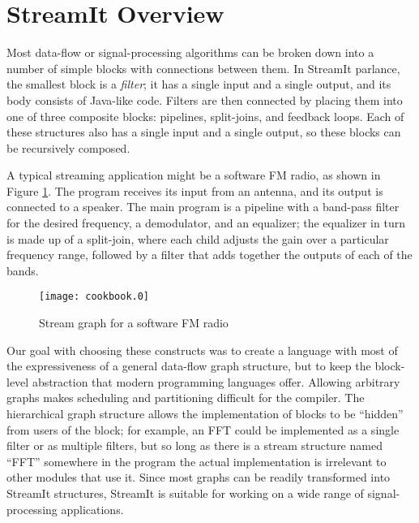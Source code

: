 \section{StreamIt Overview}

Most data-flow or signal-processing algorithms can be broken down into
a number of simple blocks with connections between them.  In StreamIt
parlance, the smallest block is a \emph{filter}; it has a single input
and a single output, and its body consists of Java-like code.  Filters
are then connected by placing them into one of three composite blocks:
pipelines, split-joins, and feedback loops.  Each of these structures
also has a single input and a single output, so these blocks can be
recursively composed.

A typical streaming application might be a software FM radio, as shown
in Figure \ref{fig:fm-radio}.  The program receives its input from an
antenna, and its output is connected to a speaker.  The main program
is a pipeline with a band-pass filter for the desired frequency, a
demodulator, and an equalizer; the equalizer in turn is made up of a
split-join, where each child adjusts the gain over a particular
frequency range, followed by a filter that adds together the outputs
of each of the bands.

\begin{figure}[htbp]
  \begin{center}
    \texttt{[image: cookbook.0]}
    \caption{Stream graph for a software FM radio}
    \label{fig:fm-radio}
  \end{center}
\end{figure}

Our goal with choosing these constructs was to create a language with
most of the expressiveness of a general data-flow graph structure, but
to keep the block-level abstraction that modern programming languages
offer.  Allowing arbitrary graphs makes scheduling and partitioning
difficult for the compiler.  The hierarchical graph structure allows
the implementation of blocks to be ``hidden'' from users of the block;
for example, an FFT could be implemented as a single filter or as
multiple filters, but so long as there is a stream structure named
``FFT'' somewhere in the program the actual implementation is
irrelevant to other modules that use it.  Since most graphs can be
readily transformed into StreamIt structures, StreamIt is suitable for
working on a wide range of signal-processing applications.

